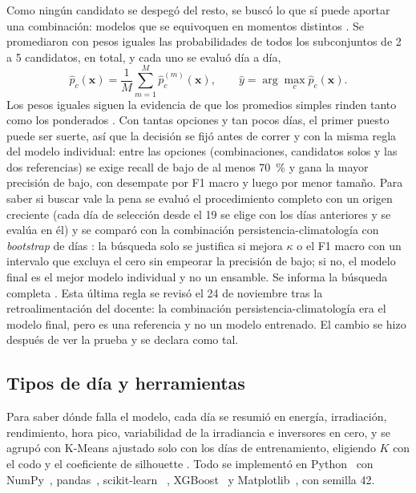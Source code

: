 \documentclass[conference]{IEEEtran}
\begin{document}
Como ning\'un candidato se despeg\'o del resto, se busc\'o lo que s\'i puede aportar una combinaci\'on: modelos que se equivoquen en momentos distintos \cite{dietterich}. Se promediaron con pesos iguales las probabilidades de todos los subconjuntos de 2 a 5 candidatos, \ncombinaciones{} en total, y cada uno se evalu\'o d\'ia a d\'ia,
\begin{equation}
\hat p_c(\mathbf{x})=\frac1M\sum_{m=1}^{M}\hat p^{(m)}_c(\mathbf{x}),\qquad \hat y=\arg\max_c \hat p_c(\mathbf{x}).
\label{eq:ensamble}
\end{equation}
Los pesos iguales siguen la evidencia de que los promedios simples rinden tanto como los ponderados \cite{clemen}. Con tantas opciones y tan pocos d\'ias, el primer puesto puede ser suerte, as\'i que la decisi\'on se fij\'o antes de correr y con la misma regla del modelo individual: entre las \nopciones{} opciones (combinaciones, candidatos solos y las dos referencias) se exige recall de bajo de al menos 70~\% y gana la mayor precisi\'on de bajo, con desempate por F1 macro y luego por menor tama\~no. Para saber si buscar vale la pena se evalu\'o el procedimiento completo con un origen creciente (cada d\'ia de selecci\'on desde el 19 se elige con los d\'ias anteriores y se eval\'ua en \'el) y se compar\'o con la combinaci\'on persistencia-climatolog\'ia con \emph{bootstrap} de d\'ias \cite{cawley}: la b\'usqueda solo se justifica si mejora $\kappa$ o el F1 macro con un intervalo que excluya el cero sin empeorar la precisi\'on de bajo; si no, el modelo final es el mejor modelo individual y no un ensamble. Se informa la b\'usqueda completa \cite{reforms}. Esta \'ultima regla se revis\'o el 24 de noviembre tras la retroalimentaci\'on del docente: la combinaci\'on persistencia-climatolog\'ia era el modelo final, pero es una referencia y no un modelo entrenado. El cambio se hizo despu\'es de ver la prueba y se declara como tal.

\subsection{Tipos de d\'ia y herramientas}
Para saber d\'onde falla el modelo, cada d\'ia se resumi\'o en energ\'ia, irradiaci\'on, rendimiento, hora pico, variabilidad de la irradiancia e inversores en cero, y se agrup\'o con K-Means ajustado solo con los d\'ias de entrenamiento, eligiendo $K$ con el codo y el coeficiente de silhouette \cite{santiago}. Todo se implement\'o en Python~\vpython{} con NumPy~\vnumpy{}, pandas~\vpandas{}, scikit-learn~\vscikitlearn{} \cite{sklearn}, XGBoost~\vxgboost{} y Matplotlib~\vmatplotlib{}, con semilla 42.
\end{document}
